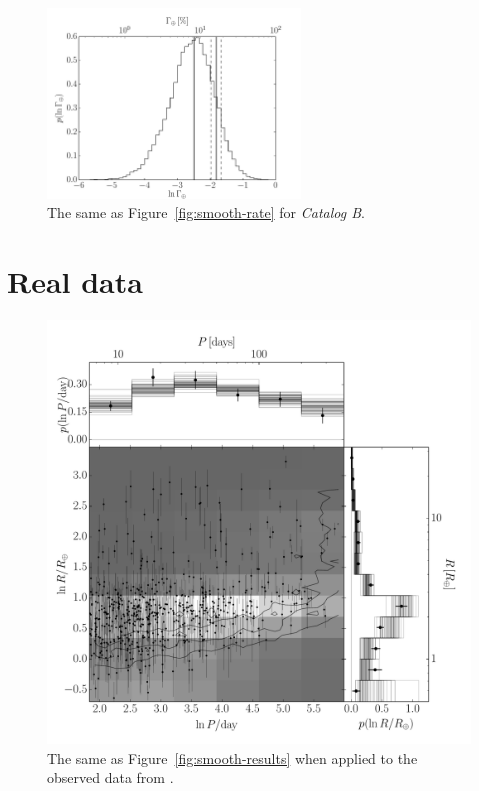 \documentclass[12pt,preprint]{aastex}
\newcommand{\Fig}[1]{Figure~\ref{fig:#1}}
\newcommand{\fig}[1]{\Fig{#1}}
\newcommand{\figlabel}[1]{\label{fig:#1}}
\newcommand{\modelb}{\emph{Catalog B}}
\begin{document}
\begin{figure}[p]
\begin{center}
\includegraphics[width=0.6\textwidth]{figures/simulation/rate.pdf}
\end{center}
\caption{%
The same as \fig{smooth-rate} for \modelb.
\figlabel{simulation-rate}}
\end{figure}

\section{Real data}



\begin{figure}[p]
\begin{center}
\includegraphics[width=\textwidth]{figures/results/results.pdf}
\end{center}
\caption{%
The same as \fig{smooth-results} when applied to the observed data from
\citet{petigura}.
\figlabel{real-results}}
\end{figure}
\end{document}
